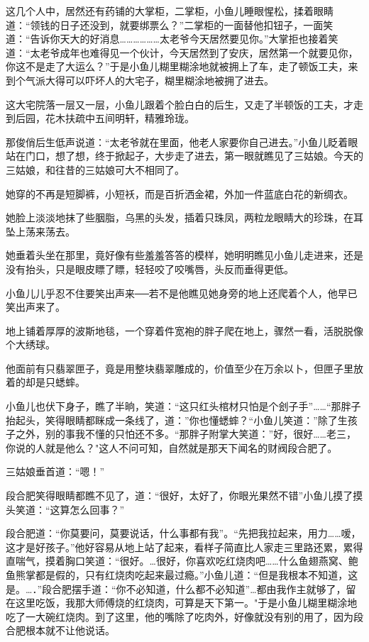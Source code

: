 \documentclass[12pt,oneside]{book}
\begin{document}
这几个人中，居然还有药铺的大掌柜，二掌柜，小鱼儿睡眼惺松，揉着眼睛道：``领钱的日子还没到，就要绑票么？''二掌柜的一面替他扣钮子，一面笑道：``告诉你天大的好消息\ldots\ldots\ldots\ldots\ldots\ldots 太老爷今天居然要见你。''大掌拒也接着笑道：``太老爷成年也难得见一个伙计，今天居然到了安庆，居然第一个就要见你，你这不是走了大运么？''于是小鱼儿糊里糊涂地就被拥上了车，走了顿饭工夫，来到个气派大得可以吓坏人的大宅子，糊里糊涂地被拥了进去。

这大宅院落一层又一层，小鱼儿跟着个脸白白的后生，又走了半顿饭的工夫，才走到后园，花木扶疏中五间明轩，精雅玲珑。

那俊俏后生低声说道：``太老爷就在里面，他老人家要你自己进去。''小鱼儿眨着眼站在门口，想了想，终于掀起子，大步走了进去，第一眼就瞧见了三姑娘。今天的三姑娘，和往昔的三姑娘可大不相同了。

她穿的不再是短脚裤，小短袄，而是百折洒金裙，外加一件蓝底白花的新绸衣。

她脸上淡淡地抹了些胭脂，乌黑的头发，插着只珠凤，两粒龙眼睛大的珍珠，在耳坠上荡来荡去。

她垂着头坐在那里，竟好像有些羞羞答答的模样，她明明瞧见小鱼儿走进来，还是没有抬头，只是眼皮瞟了瞟，轻轻咬了咬嘴唇，头反而垂得更低。

小鱼儿儿乎忍不住要笑出声来──若不是他瞧见她身旁的地上还爬着个人，他早已笑出声来了。

地上铺着厚厚的波斯地毯，一个穿着件宽袍的胖子爬在地上，骤然一看，活脱脱像个大绣球。

他面前有只翡翠匣子，竟是用整块翡翠雕成的，价值至少在万余以卜，但匣子里放着的却是只蟋蟀。

小鱼儿也伏下身子，瞧了半晌，笑道：``这只红头棺材只怕是个刽子手''\ldots\ldots{}``那胖子抬起头，笑得眼睛都眯成一条线了，道：''你也懂蟋蟀？``小鱼儿笑道：''除了生孩子之外，别的事我不懂的只怕还不多。``那胖子附掌大笑道：''好，很好\ldots\ldots 老三，你说的人就是他么？"这人不问可知，自然就是那天下闻名的财阀段合肥了。

三姑娘垂首道：``嗯！''

段合肥笑得眼睛都瞧不见了，道：``很好，太好了，你眼光果然不错''小鱼儿摸了摸头笑道：``这算怎么回事？''

段合肥道：``你莫要问，莫要说话，什么事都有我''。``先把我拉起来，用力\ldots\ldots 嗳，这才是好孩子。''他好容易从地上站了起来，看样子简直比人家走三里路还累，累得直喘气，摸着胸口笑道：``很好。\ldots 很好，你喜欢吃红烧肉吧\ldots\ldots 什么鱼翅燕窝、鲍鱼熊掌都是假的，只有红烧肉吃起来最过瘾。''小鱼儿道：``但是我根本不知道，这是。\ldots．''段合肥摆手道：``你不必知道，什么都不必知道''\ldots 都由我作主就够了，留在这里吃饭，我那大师傅烧的红烧肉，可算是天下第一。"于是小鱼儿糊里糊涂地吃了一大碗红烧肉。到了这里，他的嘴除了吃肉外，好像就没有别的用了，因为段合肥根本就不让他说话。
\end{document}
